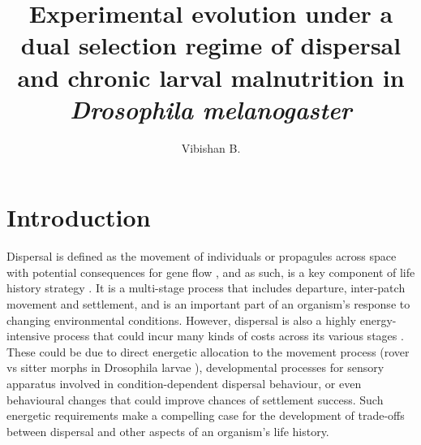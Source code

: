 \documentclass[12pt,onecolumn,twoside]{article}
\author{Vibishan B.}
\affil{Department of Biology, Indian Institute of Science Education and Research (IISER), Pune}
\title{Experimental evolution under a dual selection regime of dispersal and chronic larval malnutrition in \textit{Drosophila melanogaster}}
\date{\empty}
\begin{document}
	\maketitle
	\section{Introduction}

	Dispersal is defined as the movement of individuals or propagules across space with potential consequences for gene flow \citep{Ronce2007}, and as such, is a key component of life history strategy \citep{Clobert2012, Bonte2017}. It is a multi-stage process that includes departure, inter-patch movement and settlement, and is an important part of an organism's response to changing environmental conditions. However, dispersal is also a highly energy-intensive process that could incur many kinds of costs across its various stages \citep{Bonte2012}. These could be due to direct energetic allocation to the movement process (rover vs sitter morphs in Drosophila larvae \cite{Vijendravarma2012}), developmental processes for sensory apparatus involved in condition-dependent dispersal behaviour, or even behavioural changes that could improve chances of settlement success. Such energetic requirements make a compelling case for the development of trade-offs between dispersal and other aspects of an organism's life history.
\end{document}
